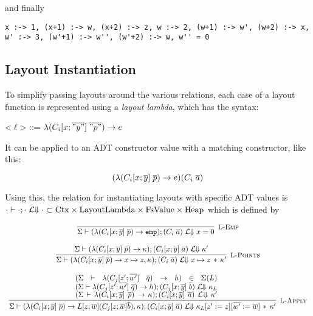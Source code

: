 \documentclass[10pt]{article}
\begin{document}
and finally

\begin{lstlisting}
x :-> 1, (x+1) :-> w, (x+2) :-> z, w :-> 2, (w+1) :-> w', (w+2) :-> x, w' :-> 3, (w'+1) :-> w'', (w'+2) :-> w, w'' = 0
\end{lstlisting}

\subsection{Layout Instantiation}

To simplify passing layouts around the various relations, each case of a layout function is represented using a \textit{layout lambda}, which has the
syntax:

\begin{grammar}
  <$\ell$> ::= $\lambda (C_i[x;\overline{"y"}]\; \overline{"p"}) \rightarrow e$
\end{grammar}

\noindent
It can be applied to an ADT constructor value with a matching constructor, like this:

\begin{equation*}
  (\lambda (C_i[x;\overline{y}]\; \overline{p}) \rightarrow e) (C_i\; \overline{a})
\end{equation*}

\noindent
Using this, the relation for instantiating layouts with specific ADT values is
$\cdot \vdash \cdot; \cdot\;\mathcal{L}\!\!\Downarrow\cdot \subset \textnormal{Ctx} \times \textnormal{LayoutLambda} \times \textnormal{FsValue} \times \textnormal{Heap}$ which is defined by

\[
  \begin{array}{c}
    \labinfer[L-Emp]{\Sigma \vdash (\lambda (C_i[x;\overline{y}]\; \overline{p}) \ra \emp); (C_i\; \overline{a}) \Lbigs x = 0}{}
    \\\\
    \labinfer[L-Points]{\Sigma \vdash (\lambda (C_i[x;\overline{y}]\; \overline{p}) \ra x \pointsto z, \kappa); (C_i\; \overline{a}) \Lbigs x \pointsto z \sep \kappa'}
      {\Sigma \vdash (\lambda (C_i[x;\overline{y}]\; \overline{p}) \ra \kappa); (C_i[x;\overline{y}]\; \overline{a}) \Lbigs \kappa'}
    \\\\
    \labinfer[L-Apply]{\Sigma \vdash (\lambda (C_i[x;\overline{y}]\; \overline{p}) \ra L[z;\overline{w}] (C_j[z;\overline{w}] \overline{b}), \kappa); (C_i[x;\overline{y}]\; \overline{a})
            \Lbigs \kappa_L[z':=z][\overline{w'}:=\overline{w}] \sep \kappa'}
      {
      & (\Sigma \vdash \lambda (C_j[z';\overline{w'}]\; \overline{q}) \ra h) \in \Sigma(L) \\
      & (\Sigma \vdash \lambda (C_j[z';\overline{w'}]\; \overline{q}) \ra h); (C_j[x;\overline{y}]\; \overline{b}) \Lbigs \kappa_L \\
      & (\Sigma \vdash \lambda (C_i[x;\overline{y}]\; \overline{p}) \ra \kappa); (C_i[x;\overline{y}]\; \overline{a}) \Lbigs \kappa'
      }
  \end{array}
\]
\end{document}
